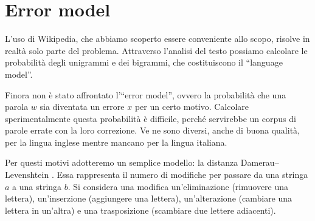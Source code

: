 \section{Error model}
\label{distanzadameraulev}
L'uso di Wikipedia, che abbiamo scoperto essere conveniente allo scopo, risolve in realtà solo parte del problema. Attraverso l'analisi del testo possiamo calcolare le probabilità degli unigrammi e dei bigrammi, che costituiscono il ``language model''. 

Finora non è stato affrontato l'``error model'', ovvero la probabilità che una parola $w$ sia diventata un errore $x$ per un certo motivo. Calcolare sperimentalmente questa probabilità è difficile, perché servirebbe un corpus di parole errate con la loro correzione. Ve ne sono diversi, anche di buona qualità, per la lingua inglese mentre mancano per la lingua italiana. 

Per questi motivi adotteremo un semplice modello: la distanza Damerau–Levenshtein \cite{damerau,levenshtein}. Essa rappresenta il numero di modifiche per passare da una stringa $a$ a una stringa $b$. Si considera una modifica un'eliminazione (rimuovere una lettera), un'inserzione (aggiungere una lettera), un'alterazione (cambiare una lettera in un'altra) e una trasposizione (scambiare due lettere adiacenti).
